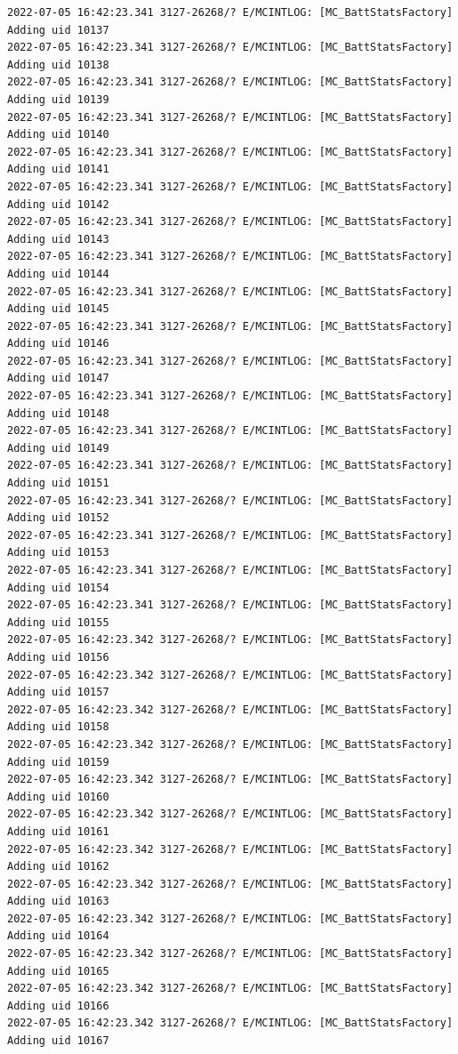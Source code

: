 \documentclass[a4paper,12pt]{book}
\begin{document}
\begin{lstlisting}
2022-07-05 16:42:23.341 3127-26268/? E/MCINTLOG: [MC_BattStatsFactory] Adding uid 10137
2022-07-05 16:42:23.341 3127-26268/? E/MCINTLOG: [MC_BattStatsFactory] Adding uid 10138
2022-07-05 16:42:23.341 3127-26268/? E/MCINTLOG: [MC_BattStatsFactory] Adding uid 10139
2022-07-05 16:42:23.341 3127-26268/? E/MCINTLOG: [MC_BattStatsFactory] Adding uid 10140
2022-07-05 16:42:23.341 3127-26268/? E/MCINTLOG: [MC_BattStatsFactory] Adding uid 10141
2022-07-05 16:42:23.341 3127-26268/? E/MCINTLOG: [MC_BattStatsFactory] Adding uid 10142
2022-07-05 16:42:23.341 3127-26268/? E/MCINTLOG: [MC_BattStatsFactory] Adding uid 10143
2022-07-05 16:42:23.341 3127-26268/? E/MCINTLOG: [MC_BattStatsFactory] Adding uid 10144
2022-07-05 16:42:23.341 3127-26268/? E/MCINTLOG: [MC_BattStatsFactory] Adding uid 10145
2022-07-05 16:42:23.341 3127-26268/? E/MCINTLOG: [MC_BattStatsFactory] Adding uid 10146
2022-07-05 16:42:23.341 3127-26268/? E/MCINTLOG: [MC_BattStatsFactory] Adding uid 10147
2022-07-05 16:42:23.341 3127-26268/? E/MCINTLOG: [MC_BattStatsFactory] Adding uid 10148
2022-07-05 16:42:23.341 3127-26268/? E/MCINTLOG: [MC_BattStatsFactory] Adding uid 10149
2022-07-05 16:42:23.341 3127-26268/? E/MCINTLOG: [MC_BattStatsFactory] Adding uid 10151
2022-07-05 16:42:23.341 3127-26268/? E/MCINTLOG: [MC_BattStatsFactory] Adding uid 10152
2022-07-05 16:42:23.341 3127-26268/? E/MCINTLOG: [MC_BattStatsFactory] Adding uid 10153
2022-07-05 16:42:23.341 3127-26268/? E/MCINTLOG: [MC_BattStatsFactory] Adding uid 10154
2022-07-05 16:42:23.341 3127-26268/? E/MCINTLOG: [MC_BattStatsFactory] Adding uid 10155
2022-07-05 16:42:23.342 3127-26268/? E/MCINTLOG: [MC_BattStatsFactory] Adding uid 10156
2022-07-05 16:42:23.342 3127-26268/? E/MCINTLOG: [MC_BattStatsFactory] Adding uid 10157
2022-07-05 16:42:23.342 3127-26268/? E/MCINTLOG: [MC_BattStatsFactory] Adding uid 10158
2022-07-05 16:42:23.342 3127-26268/? E/MCINTLOG: [MC_BattStatsFactory] Adding uid 10159
2022-07-05 16:42:23.342 3127-26268/? E/MCINTLOG: [MC_BattStatsFactory] Adding uid 10160
2022-07-05 16:42:23.342 3127-26268/? E/MCINTLOG: [MC_BattStatsFactory] Adding uid 10161
2022-07-05 16:42:23.342 3127-26268/? E/MCINTLOG: [MC_BattStatsFactory] Adding uid 10162
2022-07-05 16:42:23.342 3127-26268/? E/MCINTLOG: [MC_BattStatsFactory] Adding uid 10163
2022-07-05 16:42:23.342 3127-26268/? E/MCINTLOG: [MC_BattStatsFactory] Adding uid 10164
2022-07-05 16:42:23.342 3127-26268/? E/MCINTLOG: [MC_BattStatsFactory] Adding uid 10165
2022-07-05 16:42:23.342 3127-26268/? E/MCINTLOG: [MC_BattStatsFactory] Adding uid 10166
2022-07-05 16:42:23.342 3127-26268/? E/MCINTLOG: [MC_BattStatsFactory] Adding uid 10167

\end{lstlisting}
\end{document}
